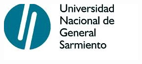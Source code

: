 \vspace{-3cm}
\begin{flushright}
	\includegraphics[width=0.33\linewidth]{../../Logos/LogoUngs.jpg}
\end{flushright}

